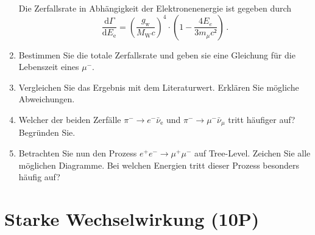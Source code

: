 \documentclass{exercise}
\begin{document}
\begin{enumerate}
    Die Zerfallsrate in Abhängigkeit der Elektronenenergie ist gegeben durch 
    \begin{equation}
        \dfrac{\mathrm{d} \Gamma}{\mathrm{d} E_\text{e}} = \left(\dfrac{g_\text{w}}{M_\text{W}c}\right)^4 \cdot \left(1 - \dfrac{4 E_e}{3 m_\mu c²}\right) \,.
    \end{equation}
    \item Bestimmen Sie die totale Zerfallsrate und geben sie eine Gleichung für die Lebenszeit eines $\mu^-$.

    \item Vergleichen Sie das Ergebnis mit dem Literaturwert. Erklären Sie mögliche Abweichungen.
    \item Welcher der beiden Zerfälle $\pi^- \to e^- \bar{\nu}_{\text{e}}$ und $\pi^- \to \mu^- \bar{\nu}_{\mu}$ tritt häufiger auf? Begründen Sie.

    \item Betrachten Sie nun den Prozess $e^+ e^- \to \mu^+ \mu^-$ auf Tree-Level. Zeichen Sie alle möglichen Diagramme. Bei welchen Energien tritt dieser Prozess besonders häufig auf? 
\end{enumerate}


\section{Starke Wechselwirkung (10P)}
\end{document}
